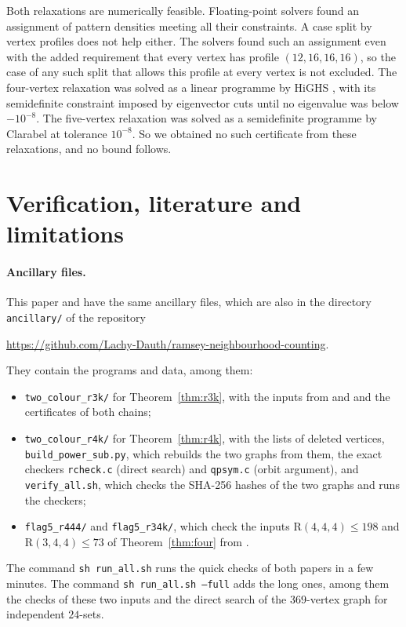 \documentclass[11pt]{article}
\theoremstyle{spacedplain}
\theoremstyle{spaceddef}
\theoremstyle{spacedremark}
\newcommand{\R}{\mathrm{R}}
\begin{document}
Both relaxations are numerically feasible.
Floating-point solvers found an assignment of pattern densities meeting all their constraints.
A case split by vertex profiles does not help either.
The solvers found such an assignment even with the added requirement that every vertex has profile $(12,16,16,16)$, so the case of any such split that allows this profile at every vertex is not excluded.
The four-vertex relaxation was solved as a linear programme by HiGHS \cite{HH18}, with its semidefinite constraint imposed by eigenvector cuts until no eigenvalue was below $-10^{-8}$.
The five-vertex relaxation was solved as a semidefinite programme by Clarabel \cite{GC24} at tolerance $10^{-8}$.
So we obtained no such certificate from these relaxations, and no bound follows.

\section{Verification, literature and limitations}\label{sec:verify}

\paragraph{Ancillary files.}
This paper and \cite{DC26} have the same ancillary files, which are also in the directory \texttt{ancillary/} of the repository
\begin{center}\url{https://github.com/Lachy-Dauth/ramsey-neighbourhood-counting}.\end{center}
They contain the programs and data, among them:
\begin{itemize}
\item \texttt{two\_colour\_r3k/} for Theorem~\ref{thm:r3k}, with the inputs from \cite{GR13} and \cite{Back3} and the certificates of both chains;
\item \texttt{two\_colour\_r4k/} for Theorem~\ref{thm:r4k}, with the lists of deleted vertices, \texttt{build\_power\_sub.py}, which rebuilds the two graphs from them, the exact checkers \texttt{rcheck.c} (direct search) and \texttt{qpsym.c} (orbit argument), and \texttt{verify\_all.sh}, which checks the SHA-256 hashes of the two graphs and runs the checkers;
\item \texttt{flag5\_r444/} and \texttt{flag5\_r34k/}, which check the inputs $\R(4,4,4)\le 198$ and $\R(3,4,4)\le 73$ of Theorem~\ref{thm:four} from \cite{DC26}.
\end{itemize}
The command \texttt{sh run\_all.sh} runs the quick checks of both papers in a few minutes.
The command \texttt{sh run\_all.sh --full} adds the long ones, among them the checks of these two inputs and the direct search of the $369$-vertex graph for independent $24$-sets.
\end{document}
